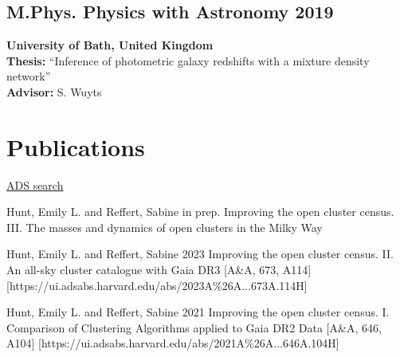 \documentclass[12pt, letterpaper]{hunt-cv}
\begin{document}
\subsection*{M.Phys. Physics with Astronomy \hfill 2019}
\begin{addmargin}[1em]{0em}
    \textbf{University of Bath, United Kingdom}\\
    \textbf{Thesis:} ``Inference of photometric galaxy redshifts with a
    mixture density network''\\
    \textbf{Advisor:} S. Wuyts
\end{addmargin}




\section*{Publications}

\href{\cvADSLink}{ADS search \faLink}


\begin{etaremune}
    \item \publication
        {Hunt, Emily L. and Reffert, Sabine}
        {in prep.}
        {Improving the open cluster census. III. The masses and dynamics of open clusters in the Milky Way}
    \item \publication
        {Hunt, Emily L. and Reffert, Sabine}
        {2023}
        {Improving the open cluster census. II. An all-sky cluster catalogue with Gaia DR3}
        [A\&A, 673, A114]
        [https://ui.adsabs.harvard.edu/abs/2023A\%26A...673A.114H]
    \item \publication
        {Hunt, Emily L. and Reffert, Sabine}
        {2021}
        {Improving the open cluster census. I. Comparison of Clustering Algorithms applied to Gaia DR2 Data}
        [A\&A, 646, A104]
        [https://ui.adsabs.harvard.edu/abs/2021A\%26A...646A.104H]
\end{etaremune}
\end{document}
